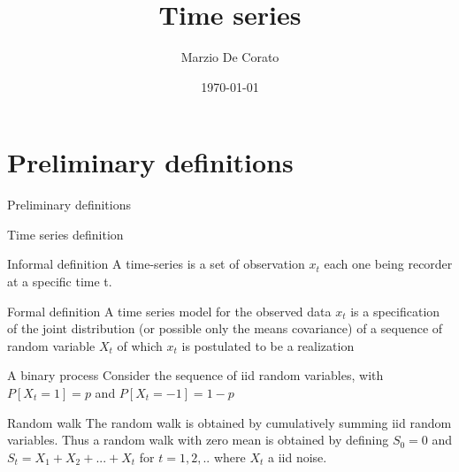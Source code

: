 \documentclass[11pt]{beamer}
\title[Review]{Time series}
\author{Marzio De Corato}
\date{\today}
\begin{document}
\begin{frame}
\vspace{+6.9 cm}  \titlepage
\end{frame}

\usebackgroundtemplate{ } 

\section{Preliminary definitions}


\begin{frame}
\begin{center}
\Huge
Preliminary definitions
\end{center}
\end{frame}

\begin{frame}{Time series definition \cite{brockwell2002introduction}}
\begin{alertblock}{Informal definition}
A time-series is a set of observation $x_{t}$ each one being recorder at a specific time t. 
\end{alertblock}
\begin{alertblock}{Formal definition }
A time series model for the observed data ${x}_{t}$ is a specification of the joint distribution (or possible only the means covariance) of a sequence of random variable ${X}_{t}$ of which ${x}_{t}$ is postulated to be a realization
\end{alertblock}
\begin{exampleblock}{A binary process}
Consider the sequence of iid random variables, with $P[X_{t}=1]=p$ and $P[X_{t}=-1]=1-p$
\end{exampleblock}
\begin{exampleblock}{Random walk}
The random walk is obtained by cumulatively summing iid random variables. Thus a random walk with zero mean is obtained by defining $S_{0}=0$ and $S_{t}=X_{1}+X_{2}+...+X_{t}$ for $t=1,2,..$ where ${X_{t}}$ a iid noise. 
\end{exampleblock}
\end{frame}
\end{document}
